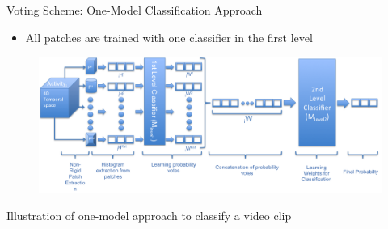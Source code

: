 \documentclass[final,hyperref={pdfpagelabels=false}]{beamer}
\begin{document}
\begin{frame}[t]
\begin{columns}[t]
\begin{column}{.465\textwidth}
\begin{block}{Voting Scheme: One-Model Classification Approach}
\begin{itemize}
\item All patches are trained with one classifier in the first level
\end{itemize}

\begin{figure}
\includegraphics[width=1.0\linewidth]{figures/oneModelApproach3}%
\end{figure}

\begin{center}
{\small Illustration of one-model approach to classify a video clip}
\end{center}




\end{block}
\end{column}
\end{columns}
\end{frame}
\end{document}
